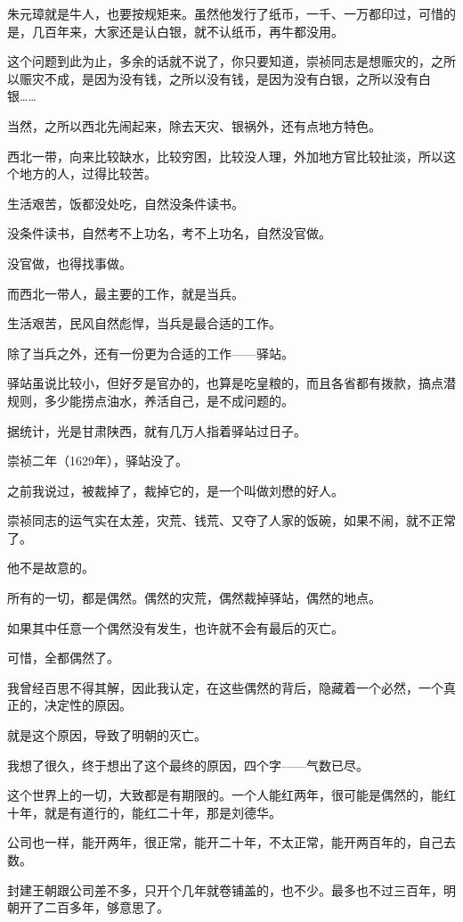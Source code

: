 \begin{multicols}{\theparacolNo}
		朱元璋就是牛人，也要按规矩来。虽然他发行了纸币，一千、一万都印过，可惜的是，几百年来，大家还是认白银，就不认纸币，再牛都没用。

		这个问题到此为止，多余的话就不说了，你只要知道，崇祯同志是想赈灾的，之所以赈灾不成，是因为没有钱，之所以没有钱，是因为没有白银，之所以没有白银……

		当然，之所以西北先闹起来，除去天灾、银祸外，还有点地方特色。

		西北一带，向来比较缺水，比较穷困，比较没人理，外加地方官比较扯淡，所以这个地方的人，过得比较苦。

		生活艰苦，饭都没处吃，自然没条件读书。

		没条件读书，自然考不上功名，考不上功名，自然没官做。

		没官做，也得找事做。

		而西北一带人，最主要的工作，就是当兵。

		生活艰苦，民风自然彪悍，当兵是最合适的工作。

		除了当兵之外，还有一份更为合适的工作——驿站。

		驿站虽说比较小，但好歹是官办的，也算是吃皇粮的，而且各省都有拨款，搞点潜规则，多少能捞点油水，养活自己，是不成问题的。

		据统计，光是甘肃陕西，就有几万人指着驿站过日子。

		崇祯二年（1629年），驿站没了。

		之前我说过，被裁掉了，裁掉它的，是一个叫做刘懋的好人。

		崇祯同志的运气实在太差，灾荒、钱荒、又夺了人家的饭碗，如果不闹，就不正常了。

		他不是故意的。

		所有的一切，都是偶然。偶然的灾荒，偶然裁掉驿站，偶然的地点。

		如果其中任意一个偶然没有发生，也许就不会有最后的灭亡。

		可惜，全都偶然了。

		我曾经百思不得其解，因此我认定，在这些偶然的背后，隐藏着一个必然，一个真正的，决定性的原因。

		就是这个原因，导致了明朝的灭亡。

		我想了很久，终于想出了这个最终的原因，四个字——气数已尽。

		这个世界上的一切，大致都是有期限的。一个人能红两年，很可能是偶然的，能红十年，就是有道行的，能红二十年，那是刘德华。

		公司也一样，能开两年，很正常，能开二十年，不太正常，能开两百年的，自己去数。

		封建王朝跟公司差不多，只开个几年就卷铺盖的，也不少。最多也不过三百年，明朝开了二百多年，够意思了。


\end{multicols}
